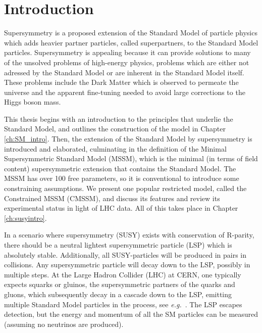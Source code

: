 \documentclass[twoside,english]{uiofysmaster}
\begin{document}
\tableofcontents
\listoffigures
\listoftables

\cleardoublepage
{}

\chapter*{Introduction}
Supersymmetry is a proposed extension of the Standard Model of particle physics which adds heavier partner particles, called superpartners, to the Standard Model particles. Supersymmetry is appealing because it can provide solutions to many of the unsolved problems of high-energy physics, problems which are either not adressed by the Standard Model or are inherent in the Standard Model itself. These problems include the Dark Matter which is observed to permeate the universe and the apparent fine-tuning needed to avoid large corrections to the Higgs boson mass.

This thesis begins with an introduction to the principles that underlie the Standard Model, and outlines the construction of the model in Chapter \ref{ch:SM_intro}. Then, the extension of the Standard Model by supersymmetry is introduced and elaborated, culminating in the definition of the Minimal Supersymmetric Standard Model (MSSM), which is the minimal (in terms of field content) supersymmetric extension that contains the Standard Model. The MSSM has over 100 free parameters, so it is conventional to introduce some constraining assumptions. We present one popular restricted model, called the Constrained MSSM (CMSSM), and discuss its features and review its experimental status in light of LHC data. All of this takes place in Chapter \ref{ch:susyintro}.

In a scenario where supersymmetry (SUSY) exists with conservation of R-parity, there should be a neutral lightest supersymmetric particle (LSP) which is absolutely stable. Additionally, all SUSY-particles will be produced in pairs in collisions. Any supersymmetric particle will decay down to the LSP, possibly in multiple steps. At the Large Hadron Collider (LHC) at CERN, one typically expects squarks or gluinos, the supersymmetric partners of the quarks and gluons, which subsequently decay in a cascade down to the LSP, emitting multiple Standard Model particles in the process, see {\it e.g.}~\cite{Martin:1997ns}. The LSP escapes detection, but the energy and momentum of all the SM particles can be measured (assuming no neutrinos are produced).
\end{document}
